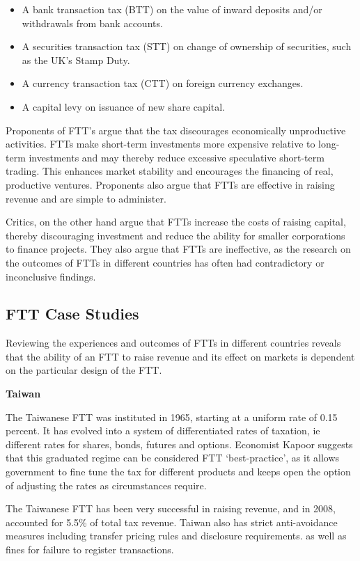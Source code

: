 \documentclass[]{tufte-handout}
\providecommand{\tightlist}{%
  \setlength{\itemsep}{0pt}\setlength{\parskip}{0pt}}
\begin{document}
\begin{itemize}
\tightlist
\item
  A bank transaction tax (BTT) on the value of inward deposits and/or
  withdrawals from bank accounts.
\item
  A securities transaction tax (STT) on change of ownership of
  securities, such as the UK's Stamp Duty.
\item
  A currency transaction tax (CTT) on foreign currency exchanges.
\item
  A capital levy on issuance of new share capital.
\end{itemize}

Proponents of FTT's argue that the tax discourages economically
unproductive activities. FTTs make short-term investments more expensive
relative to long-term investments and may thereby reduce excessive
speculative short-term trading. This enhances market stability and
encourages the financing of real, productive ventures. Proponents also
argue that FTTs are effective in raising revenue and are simple to
administer.

Critics, on the other hand argue that FTTs increase the costs of raising
capital, thereby discouraging investment and reduce the ability for
smaller corporations to finance projects. They also argue that FTTs are
ineffective, as the research on the outcomes of FTTs in different
countries has often had contradictory or inconclusive findings.

\hypertarget{ftt-case-studies}{%
\subsection{FTT Case Studies}\label{ftt-case-studies}}

Reviewing the experiences and outcomes of FTTs in different countries
reveals that the ability of an FTT to raise revenue and its effect on
markets is dependent on the particular design of the FTT.

\textbf{Taiwan}

The Taiwanese FTT was instituted in 1965, starting at a uniform rate of
0.15 percent. It has evolved into a system of differentiated rates of
taxation, ie different rates for shares, bonds, futures and options.
Economist Kapoor suggests that this graduated regime can be considered
FTT `best-practice', as it allows government to fine tune the tax for
different products and keeps open the option of adjusting the rates as
circumstances require.

The Taiwanese FTT has been very successful in raising revenue, and in
2008, accounted for 5.5\% of total tax revenue. Taiwan also has strict
anti-avoidance measures including transfer pricing rules and disclosure
requirements. as well as fines for failure to register transactions.
\end{document}
